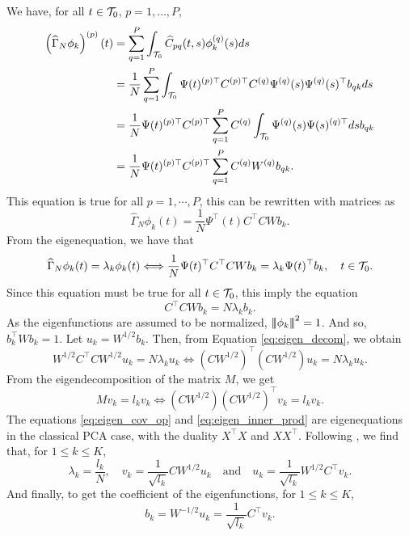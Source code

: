 We have, for all $t \in \mathcal{T}_{0}$, $p = 1, \dots, P$,
\begin{align*}
    \left(\widehat{\Gamma}_N \phi_k\right)^{(p)}(t) &= \sum_{q = 1}^P \int_{\mathcal{T}_{0}} \widehat{C}_{p q}(t, s)\phi_k^{(q)}(s)ds \\
    &= \frac{1}{N}\sum_{q = 1}^P \int_{\mathcal{T}_{0}} \Psi(t)^{(p) \top} C^{(p) \top} C^{(q)} \Psi^{(q)}(s) \Psi^{(q)}(s)^\top b_{q k} ds \\
    &= \frac{1}{N} \Psi(t)^{(p) \top} C^{(p) \top} \sum_{q = 1}^P C^{(q)} \int_{\mathcal{T}_{0}} \Psi^{(q)}(s) \Psi(s)^{(q) \top} ds b_{q k} \\
    &= \frac{1}{N} \Psi(t)^{(p) \top} C^{(p) \top} \sum_{q = 1}^P C^{(q)} W^{(q)} b_{q k}. \\
\end{align*}
This equation is true for all $p = 1, \cdots, P$, this can be rewritten with matrices as
\begin{equation}
    \widehat{\Gamma}_N \phi_k(t) = \frac{1}{N}\Psi^\top(t) C^\top C W b_k.
\end{equation}
From the eigenequation, we have that
\begin{equation}
    \widehat{\Gamma}_N \phi_k(t) = \lambda_k \phi_k(t) \Longleftrightarrow \frac{1}{N} \Psi(t)^\top C^\top C W b_k = \lambda_k \Psi(t)^\top b_k, \quad t \in \mathcal{T}_{0}.
\end{equation}
Since this equation must be true for all $t \in \mathcal{T}_{0}$, this imply the equation
\begin{equation}\label{eq:eigen_decom}
    C^\top C W b_k = N\lambda_k b_k.
\end{equation}
As the eigenfunctions are assumed to be normalized, $\left|\!\left|\!\left|\phi_k\right|\!\right|\!\right|^2 = 1$. And so, $b_k^\top W b_k = 1$. Let $u_k = W^{1/2}b_k$. Then, from Equation \eqref{eq:eigen_decom}, we obtain
\begin{equation}\label{eq:eigen_cov_op}
    W^{1/2} C^\top C W^{1/2} u_k = N\lambda_k u_k \Longleftrightarrow \left(C W^{1/2}\right)^\top \left(C W^{1/2}\right) u_k = N\lambda_k u_k.
\end{equation}
From the eigendecomposition of the matrix $M$, we get
\begin{equation}\label{eq:eigen_inner_prod}
    Mv_k = l_k v_k \Longleftrightarrow \left(C W^{1/2}\right)\left(C W^{1/2}\right)^\top v_k = l_k v_k.
\end{equation}
The equations \eqref{eq:eigen_cov_op} and \eqref{eq:eigen_inner_prod} are eigenequations in the classical PCA case, with the duality $X^\top X$ and $XX^\top$. Following \cite{pagesMultipleFactorAnalysis2014,hardleAppliedMultivariateStatistical2019}, we find that, for $1 \leq k \leq K$,
\begin{equation}
    \lambda_k = \frac{l_k}{N}, \quad v_k = \frac{1}{\sqrt{l_k}}C W^{1/2} u_k \quad\text{and}\quad u_k = \frac{1}{\sqrt{l_k}} W^{1/2} C^\top v_k.
\end{equation}
And finally, to get the coefficient of the eigenfunctions, for $1 \leq k \leq K$,
\begin{equation}
    b_k = W^{-1/2}u_k = \frac{1}{\sqrt{l_k}} C^\top v_k.
\end{equation}

